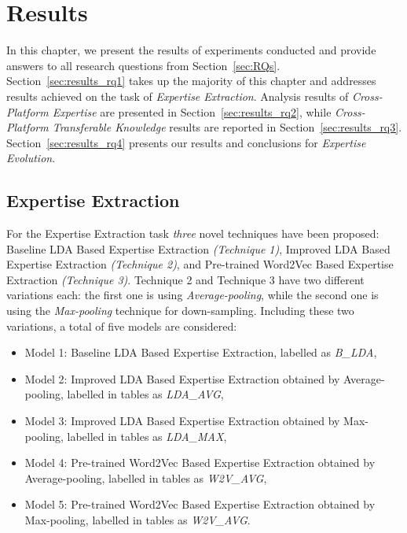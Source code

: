 \chapter{Results\label{chap:result}}

    In this chapter, we present the results of experiments conducted and provide answers to all research questions from Section~\ref{sec:RQs}. Section~\ref{sec:results_rq1} takes up the majority of this chapter and addresses results achieved on the task of \emph{Expertise Extraction}. Analysis results of \emph{Cross-Platform Expertise} are presented in Section~\ref{sec:results_rq2}, while \emph{Cross-Platform Transferable Knowledge} results are reported in Section~\ref{sec:results_rq3}.  Section~\ref{sec:results_rq4} presents our results and conclusions for \emph{Expertise Evolution}.

    \section{Expertise Extraction\label{sec:results_rq1}}
        
       For the Expertise Extraction task \emph{three} novel techniques have been proposed: Baseline LDA Based Expertise Extraction \emph{(Technique 1)}, Improved LDA Based Expertise Extraction \emph{(Technique 2)}, and Pre-trained Word2Vec Based Expertise Extraction \emph{(Technique 3)}. Technique 2 and Technique 3 have two different variations each: the first one is using \emph{Average-pooling}, while the second one is using the \emph{Max-pooling} technique for down-sampling. Including these two variations, a total of five models are considered:
        
        
        \begin{itemize}
            \item Model 1: Baseline LDA Based Expertise Extraction, labelled as \emph{B\_LDA},
            \item Model 2: Improved LDA Based Expertise Extraction obtained by Average-pooling, labelled in tables as \emph{LDA\_AVG},
            \item Model 3: Improved LDA Based Expertise Extraction obtained by Max-pooling, labelled in tables as \emph{LDA\_MAX},
            \item Model 4: Pre-trained Word2Vec Based Expertise Extraction obtained by Average-pooling, labelled in tables as \emph{W2V\_AVG},
            \item Model 5: Pre-trained Word2Vec Based Expertise Extraction obtained by Max-pooling, labelled in tables as \emph{W2V\_AVG}.
        \end{itemize}
        
